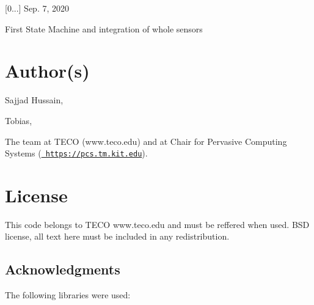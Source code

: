 \begin{DoxyItemize}
\item \mbox{[}0...\mbox{]} Sep. 7, 2020
\begin{DoxyItemize}
\item First State Machine and integration of whole sensors
\end{DoxyItemize}
\end{DoxyItemize}\hypertarget{index_author}{}\section{Author(s)}\label{index_author}

\begin{DoxyItemize}
\item Sajjad Hussain,
\item Tobias,
\end{DoxyItemize}

The team at T\+E\+CO (www.\+teco.\+edu) and at Chair for Pervasive Computing Systems (\href{https://pcs.tm.kit.edu}{\texttt{ https\+://pcs.\+tm.\+kit.\+edu}}).\hypertarget{index_license}{}\section{License}\label{index_license}
This code belongs to T\+E\+CO www.\+teco.\+edu and must be reffered when used. B\+SD license, all text here must be included in any redistribution. \hypertarget{index_ack}{}\subsection{Acknowledgments}\label{index_ack}
The following libraries were used\+:~\newline

